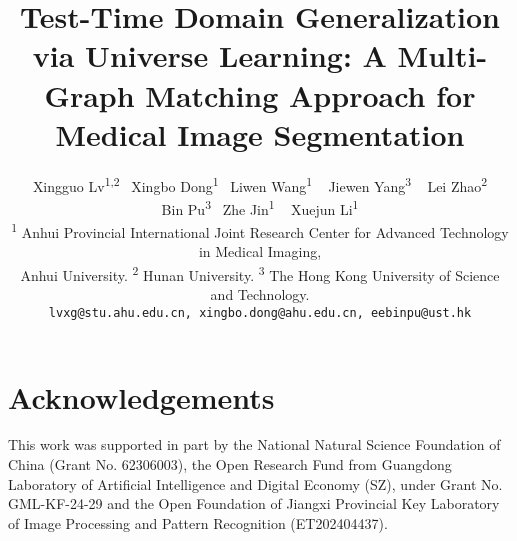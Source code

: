 \documentclass[10pt,twocolumn,letterpaper]{article}
\title{Test-Time Domain Generalization via Universe Learning: A Multi-Graph Matching Approach for Medical Image Segmentation}
\author{Xingguo Lv\textsuperscript{1,2}~ Xingbo Dong\textsuperscript{1}\footnotemark[2] ~ Liwen Wang\textsuperscript{1} ~ Jiewen Yang\textsuperscript{3} ~ Lei Zhao\textsuperscript{2}\\  Bin Pu\textsuperscript{3}\footnotemark[2] ~ Zhe Jin\textsuperscript{1} ~ Xuejun Li\textsuperscript{1}\\
\textsuperscript{1} Anhui Provincial International Joint Research Center for Advanced Technology in Medical Imaging,\\ Anhui University.
\textsuperscript{2} Hunan University.
\textsuperscript{3} The Hong Kong University of Science and Technology.\\
{\tt\small lvxg@stu.ahu.edu.cn, xingbo.dong@ahu.edu.cn, eebinpu@ust.hk}
}
\begin{document}
\maketitle








\newpage
\section*{Acknowledgements}

This work was supported in part by the National Natural Science Foundation of China (Grant No. 62306003), the Open Research Fund from Guangdong Laboratory of Artificial Intelligence and Digital Economy (SZ), under Grant No. GML-KF-24-29 and the Open Foundation of Jiangxi Provincial Key Laboratory of Image Processing and Pattern Recognition (ET202404437).
{
    \small
    
    
    
}



% 
\end{document}
